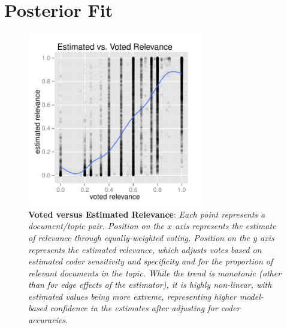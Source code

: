 \documentclass{article}
\begin{document}
\section{Posterior Fit}

\begin{figure}
\begin{center}
\includegraphics[height=3.0in]{img/vote_vs_estimate.pdf}
\end{center}
\caption{\small {\bf Voted versus Estimated Relevance}: {\it Each point
represents a document/topic pair.  Position on the $x$ axis represents
the estimate of relevance through equally-weighted voting.  Position
on the $y$ axis represents the estimated relevance, which adjusts
votes based on estimated coder sensitivity and specificity and for the
proportion of relevant documents in the topic.  While the trend is
monotonic (other than for edge effects of the estimator), it is highly
non-linear, with estimated values being more extreme, representing
higher model-based confidence in the estimates after adjusting for
coder accuracies.}}
\end{figure}
\end{document}
